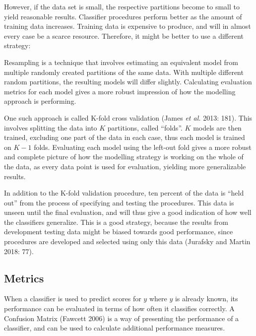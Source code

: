 \documentclass[12pt,twoside]{reedthesis}
\begin{document}
However, if the data set is small, the respective partitions become to
small to yield reasonable results. Classifier procedures perform better
as the amount of training data increases. Training data is expensive to
produce, and will in almost every case be a scarce resource. Therefore,
it might be better to use a different strategy:

Resampling is a technique that involves estimating an equivalent model
from multiple randomly created partitions of the same data. With
multiple different random partitions, the resulting models will differ
slightly. Calculating evaluation metrics for each model gives a more
robust impression of how the modelling approach is performing.

One such approach is called K-fold cross validation (James \emph{et al.}
2013: 181). This involves splitting the data into \(K\) partitions,
called ``folds''. \(K\) models are then trained, excluding one part of
the data in each case, thus each model is trained on \(K-1\) folds.
Evaluating each model using the left-out fold gives a more robust and
complete picture of how the modelling strategy is working on the whole
of the data, as every data point is used for evaluation, yielding more
generalizable results.

In addition to the K-fold validation procedure, ten percent of the data
is ``held out'' from the process of specifying and testing the
procedures. This data is unseen until the final evaluation, and will
thus give a good indication of how well the classifiers generalize. This
is a good strategy, because the results from development testing data
might be biased towards good performance, since procedures are developed
and selected using only this data (Jurafsky and Martin 2018: 77).

\subsection{Metrics}\label{metrics}

When a classifier is used to predict scores for \(y\) where \(y\) is
already known, its performance can be evaluated in terms of how often it
classifies correctly. A Confusion Matrix (Fawcett 2006) is a way of
presenting the performance of a classifier, and can be used to calculate
additional performance measures.
\end{document}
